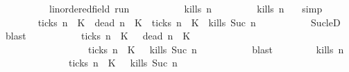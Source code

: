 \begin{isabellebody}
\ \ \isamarkupfalse%
\isanewline
\ \ \ \ \isacommand{{\isacharbraceleft}}\isamarkupfalse%
\ \isamarkupfalse%
\ {\isasymrho}{\isacharcolon}{\isacharcolon}{\isacartoucheopen}{\isacharprime}{\isasymtau}{\isacharcolon}{\isacharcolon}linordered{\isacharunderscore}field\ run{\isacartoucheclose}\isanewline
\ \ \ \ \ \ \isamarkupfalse%
\ {\isacartoucheopen}{\isasymrho}\ {\isasymin}\ {\isacharbraceleft}{\isasymrho}{\isachardot}\ {\isacharquery}kills\ n\ {\isasymrho}{\isacharbraceright}{\isacartoucheclose}\isanewline
\ \ \ \ \ \ \isamarkupfalse%
\ {\isacartoucheopen}{\isacharquery}kills\ n\ {\isasymrho}{\isacartoucheclose}\ \isamarkupfalse%
\ simp\isanewline
\ \ \ \ \ \ \isamarkupfalse%
\ {\isacartoucheopen}{\isacharparenleft}{\isacharquery}ticks\ n\ {\isasymrho}\ K\ {\isasymand}\ {\isacharquery}dead\ n\ {\isasymrho}\ K\ {\isasymor}\ {\isacharparenleft}{\isasymnot}{\isacharquery}ticks\ n\ {\isasymrho}\ K\ {\isasymand}\ {\isacharquery}kills\ {\isacharparenleft}Suc\ n{\isacharparenright}\ {\isasymrho}{\isacharparenright}{\isacartoucheclose}\isanewline
\ \ \ \ \ \ \ \ \isamarkupfalse%
\ Suc{\isacharunderscore}leD\ \isamarkupfalse%
\ blast\isanewline
\ \ \ \ \ \ \isamarkupfalse%
\ {\isacartoucheopen}{\isasymrho}\ {\isasymin}\ {\isacharparenleft}{\isacharbraceleft}{\isasymrho}{\isachardot}\ {\isacharquery}ticks\ n\ {\isasymrho}\ K\ {\isasyminter}\ {\isacharbraceleft}{\isasymrho}{\isachardot}\ {\isacharquery}dead\ n\ {\isasymrho}\ K\isanewline
\ \ \ \ \ \ \ \ \ \ \ \ \ \ \ {\isasymunion}\ {\isacharparenleft}{\isacharbraceleft}{\isasymrho}{\isachardot}\ {\isasymnot}\ {\isacharquery}ticks\ n\ {\isasymrho}\ K\ {\isasyminter}\ {\isacharbraceleft}{\isasymrho}{\isachardot}\ {\isacharquery}kills\ {\isacharparenleft}Suc\ n{\isacharparenright}\ {\isasymrho}{\isacharbraceright}{\isacharparenright}{\isacartoucheclose}\isanewline
\ \ \ \ \ \ \ \ \isamarkupfalse%
\ blast\isanewline
\ \ \ \ \isacommand{{\isacharbraceright}}\isamarkupfalse%
\ \isamarkupfalse%
\ {\isacartoucheopen}{\isacharbraceleft}{\isasymrho}{\isachardot}\ {\isacharquery}kills\ n\ {\isasymrho}{\isacharbraceright}\isanewline
\ \ \ \ \ \ \ \ \ \ \ {\isasymsubseteq}\ {\isacharbraceleft}{\isasymrho}{\isachardot}\ {\isasymnot}\ {\isacharquery}ticks\ n\ {\isasymrho}\ K\ {\isasyminter}\ {\isacharbraceleft}{\isasymrho}{\isachardot}\ {\isacharquery}kills\ {\isacharparenleft}Suc\ n{\isacharparenright}\ {\isasymrho}{\isacharbraceright}\ \isanewline

\end{isabellebody}

